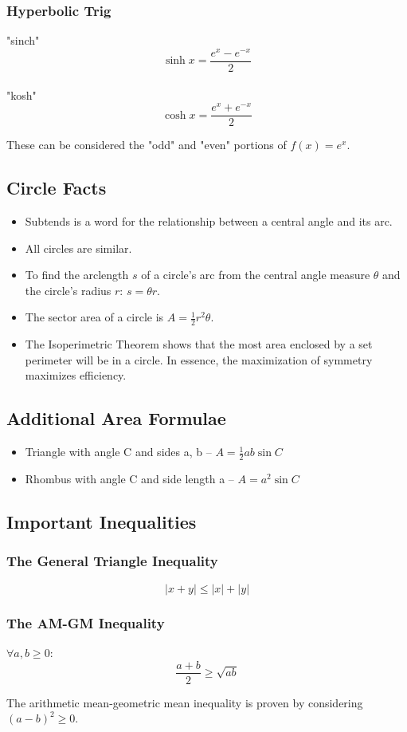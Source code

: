 \documentclass{article}
\begin{document}
\subsubsection{Hyperbolic Trig}
"sinch"
$$\sinh{x}=\frac{e^x-e^{-x}}{2}$$\\
"kosh"
$$\cosh{x}=\frac{e^x+e^{-x}}{2}$$

These can be considered the "odd" and "even" portions of $f(x)=e^x$.

\subsection{Circle Facts}
\begin{itemize}
    \item Subtends is a word for the relationship between a central angle and its arc.
    \item All circles are similar.
    \item To find the arclength $s$ of a circle's arc from the central angle measure $\theta$ and the circle's radius $r$: $s=\theta r$.
    \item The sector area of a circle is $A=\frac{1}{2}r^2\theta$.
    \item The Isoperimetric Theorem shows that the most area enclosed by a set perimeter will be in a circle. In essence, the maximization of symmetry maximizes efficiency.
\end{itemize}

\subsection{Additional Area Formulae}
\begin{itemize}
    \item Triangle with angle C and sides a, b -- $A=\frac{1}{2}ab\sin{C}$
    \item Rhombus with angle C and side length a -- $A=a^2\sin{C}$
\end{itemize}

\subsection{Important Inequalities}
\subsubsection{The General Triangle Inequality}
$$|x+y| \le |x| + |y|$$
\subsubsection{The AM-GM Inequality}
$\forall a,b \ge 0$:
$$\frac{a+b}{2}\ge\sqrt{ab}$$

The arithmetic mean-geometric mean inequality is proven by considering $(a-b)^2\ge0$.
\end{document}
